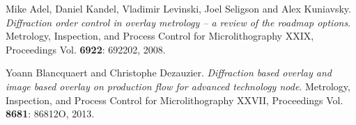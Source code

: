 \documentclass[pra,superscriptaddress,reprint]{revtex4-1}
\begin{document}
\begin{thebibliography}{99}

Mike Adel, Daniel Kandel, Vladimir Levinski, Joel Seligson and Alex Kuniavsky.
\textit{Diffraction order control in overlay metrology -- a review of the roadmap options}.
Metrology, Inspection, and Process Control for Microlithography XXIX, Proceedings Vol. \textbf{6922}: 692202, 2008.

Yoann Blancquaert and Christophe Dezauzier.
\textit{Diffraction based overlay and image based overlay on production flow for advanced technology node}.
Metrology, Inspection, and Process Control for Microlithography XXVII, Proceedings Vol. \textbf{8681}: 86812O, 2013.







\end{thebibliography}
\end{document}
